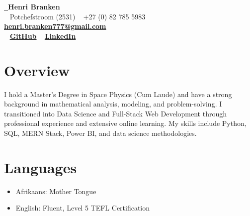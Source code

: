 \documentclass[a4paper,10pt]{article}
\begin{document}
	
\begin{center}
	{\LARGE\textbf{\href{https://henribranken.github.io/MyCV/}{\faHandPointer~}Henri Branken}}\\[0.5cm]
	\faHome~ Potchefstroom (2531) \quad
	\faPhone~ +27 (0) 82 785 5983 \quad
	\faEnvelope~ \href{mailto:henri.branken777@gmail.com}{\textbf{henri.branken777@gmail.com}}\\
	\faGithub~ \href{https://github.com/HenriBranken}{\textbf{GitHub}}\quad
	\faLinkedin~ \href{https://www.linkedin.com/in/henri-branken-1423a2153/}{\textbf{LinkedIn}}
\end{center}
	
\section*{Overview}
I hold a Master’s Degree in Space Physics (Cum Laude) and have a strong background in mathematical analysis, modeling, and problem-solving. I transitioned into Data Science and Full-Stack Web Development through professional experience and extensive online learning. My skills include Python, SQL, MERN Stack, Power BI, and data science methodologies.

\section*{Languages}
\begin{itemize}
	\item Afrikaans: Mother Tongue
	\item English: Fluent, Level 5 TEFL Certification
\end{itemize}
\end{document}
